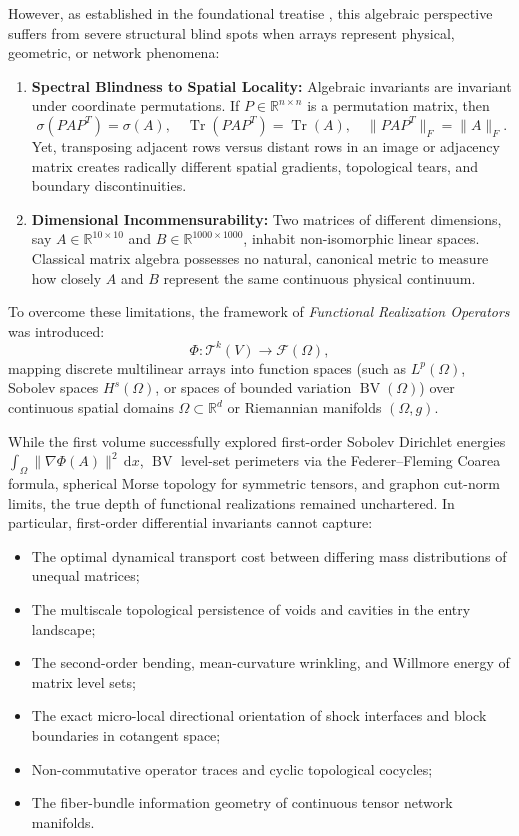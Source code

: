 \documentclass[11pt,a4paper,reqno]{amsart}
\theoremstyle{definition}
\numberwithin{equation}{section}
\newcommand{\R}{\mathbb{R}}
\newcommand{\Tr}{\operatorname{Tr}}
\newcommand{\BV}{\operatorname{BV}}
\newcommand{\dif}{\,\mathrm{d}}
\begin{document}
However, as established in the foundational treatise \cite{silvafilho2026beyond}, this algebraic perspective suffers from severe structural blind spots when arrays represent physical, geometric, or network phenomena:
\begin{enumerate}[label=(\roman*)]
    \item \textbf{Spectral Blindness to Spatial Locality:} Algebraic invariants are invariant under coordinate permutations. If $P \in \R^{n \times n}$ is a permutation matrix, then
    \begin{equation}
        \sigma(PAP^T) = \sigma(A), \quad \Tr(PAP^T) = \Tr(A), \quad \|PAP^T\|_F = \|A\|_F.
    \end{equation}
    Yet, transposing adjacent rows versus distant rows in an image or adjacency matrix creates radically different spatial gradients, topological tears, and boundary discontinuities.
    \item \textbf{Dimensional Incommensurability:} Two matrices of different dimensions, say $A \in \R^{10 \times 10}$ and $B \in \R^{1000 \times 1000}$, inhabit non-isomorphic linear spaces. Classical matrix algebra possesses no natural, canonical metric to measure how closely $A$ and $B$ represent the same continuous physical continuum.
\end{enumerate}

To overcome these limitations, the framework of \emph{Functional Realization Operators} was introduced:
\begin{equation}
    \Phi \colon \mathcal{T}^k(V) \longrightarrow \mathcal{F}(\Omega),
\end{equation}
mapping discrete multilinear arrays into function spaces (such as $L^p(\Omega)$, Sobolev spaces $H^s(\Omega)$, or spaces of bounded variation $\BV(\Omega)$) over continuous spatial domains $\Omega \subset \R^d$ or Riemannian manifolds $(\Omega, g)$. 

While the first volume \cite{silvafilho2026beyond} successfully explored first-order Sobolev Dirichlet energies $\int_\Omega \|\nabla \Phi(A)\|^2 \dif x$, $\BV$ level-set perimeters via the Federer--Fleming Coarea formula, spherical Morse topology for symmetric tensors, and graphon cut-norm limits, the true depth of functional realizations remained unchartered. In particular, first-order differential invariants cannot capture:
\begin{itemize}
    \item The optimal dynamical transport cost between differing mass distributions of unequal matrices;
    \item The multiscale topological persistence of voids and cavities in the entry landscape;
    \item The second-order bending, mean-curvature wrinkling, and Willmore energy of matrix level sets;
    \item The exact micro-local directional orientation of shock interfaces and block boundaries in cotangent space;
    \item Non-commutative operator traces and cyclic topological cocycles;
    \item The fiber-bundle information geometry of continuous tensor network manifolds.
\end{itemize}
\end{document}
